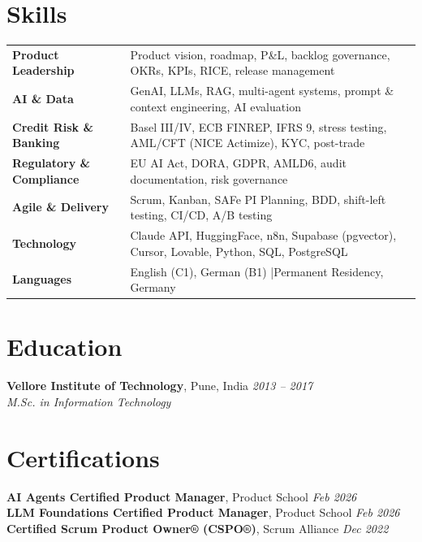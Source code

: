 \documentclass[10pt,letterpaper]{article}
\newcommand{\sep}{\unskip\hspace{0.5em}|\hspace{0.5em}\ignorespaces}
\begin{document}
\section{Skills}
\renewcommand{\arraystretch}{1.08}
\begin{tabularx}{\textwidth}{@{}>{\bfseries}p{1.68in}>{\raggedright\arraybackslash}X@{}}
  Product Leadership   & Product vision, roadmap, P\&L, backlog governance, OKRs, KPIs, RICE, release management \\
  AI \& Data           & GenAI, LLMs, RAG, multi-agent systems, prompt \& context engineering, AI evaluation \\
  Credit Risk \& Banking & Basel III/IV, ECB FINREP, IFRS 9, stress testing, AML/CFT (NICE Actimize), KYC, post-trade \\
  Regulatory \& Compliance & EU AI Act, DORA, GDPR, AMLD6, audit documentation, risk governance \\
  Agile \& Delivery    & Scrum, Kanban, SAFe PI Planning, BDD, shift-left testing, CI/CD, A/B testing \\
  Technology           & Claude API, HuggingFace, n8n, Supabase (pgvector), Cursor, Lovable, Python, SQL, PostgreSQL \\
  Languages            & English (C1), German (B1) \sep Permanent Residency, Germany \\
\end{tabularx}

\section{Education}
{\fontsize{11}{13}\selectfont\bfseries Vellore Institute of Technology}, Pune, India \hfill {\itshape 2013 -- 2017}\\
{\itshape M.Sc. in Information Technology}

\section{Certifications}
{\bfseries AI Agents Certified Product Manager}, Product School \hfill {\itshape Feb 2026}\\[1pt]
{\bfseries LLM Foundations Certified Product Manager}, Product School \hfill {\itshape Feb 2026}\\[1pt]
{\bfseries Certified Scrum Product Owner® (CSPO®)}, Scrum Alliance \hfill {\itshape Dec 2022}
\end{document}
